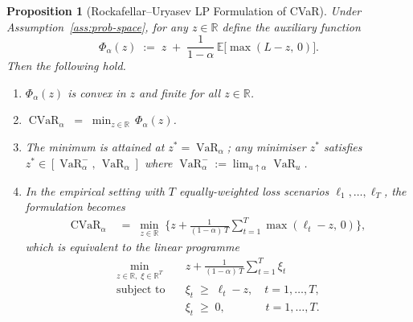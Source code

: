 \documentclass[12pt,openany]{book}
\newcommand{\R}{\mathbb{R}}
\newcommand{\E}{\mathbb{E}}
\numberwithin{equation}{chapter}
\theoremstyle{plain}
\newtheorem{proposition}[theorem]{Proposition}
\theoremstyle{definition}
\theoremstyle{remark}
\numberwithin{equation}{chapter}
\theoremstyle{plain}
\DeclareMathOperator{\CVaR}{CVaR}
\DeclareMathOperator{\VaR}{VaR}
\begin{document}
\begin{proposition}[Rockafellar--Uryasev LP Formulation of CVaR]
\label{prop:cvar-lp}
Under Assumption~\ref{ass:prob-space}, for any
$z \in \R$ define the auxiliary function
\begin{equation}
  \Phi_\alpha(z)
    \;:=\; z \;+\; \frac{1}{1-\alpha}\,\E\!\bigl[\max(L - z,\,0)\bigr].
  \label{eq:phi-alpha}
\end{equation}
Then the following hold.
\begin{enumerate}
  \item $\Phi_\alpha(z)$ is convex in $z$ and finite for all $z \in \R$.
  \item $\CVaR_\alpha \;=\; \min_{z \in \R}\,\Phi_\alpha(z)$.
  \item The minimum is attained at $z^* = \VaR_\alpha$; any minimiser
        $z^*$ satisfies $z^* \in [\VaR_\alpha^-,\,\VaR_\alpha]$ where
        $\VaR_\alpha^- := \lim_{u\uparrow\alpha}\VaR_u$.
  \item In the empirical setting with $T$ equally-weighted loss
        scenarios $\ell_1,\ldots,\ell_T$, the formulation becomes
        \begin{align}
          \CVaR_\alpha
            &\;=\; \min_{z\in\R}\;\biggl\{
                z + \frac{1}{(1-\alpha)\,T}
                \sum_{t=1}^{T}\max(\ell_t - z,\,0)
              \biggr\}, \label{eq:cvar-lp}
        \end{align}
        which is equivalent to the linear programme
        \begin{align}
          \min_{z\in\R,\;\xi\in\R^T}\;
            &z + \frac{1}{(1-\alpha)\,T}\sum_{t=1}^{T}\xi_t
              \label{eq:cvar-lp-obj}\\
          \text{subject to}\quad
            &\xi_t \;\geq\; \ell_t - z, \quad t = 1,\ldots,T,
              \label{eq:cvar-lp-c1}\\
            &\xi_t \;\geq\; 0, \qquad\quad\;\; t = 1,\ldots,T.
              \label{eq:cvar-lp-c2}
        \end{align}
\end{enumerate}
\end{proposition}
\end{document}
